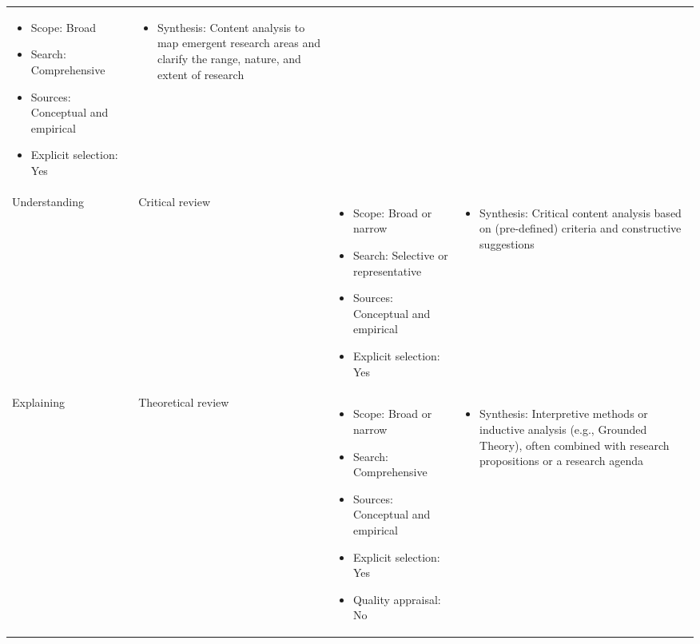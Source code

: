 \documentclass[11pt]{scrartcl}
\theoremstyle{aufgabenstyle}
\begin{document}
\begin{table}[H]
\begin{tabularx}{\textwidth}{l p{2.4cm} X X}
\begin{itemize}[leftmargin=*, noitemsep, topsep=0pt]
			\item Scope: Broad
			\item Search: Comprehensive
			\item Sources: Conceptual and empirical
			\item Explicit selection: Yes
		\end{itemize} & 
		\begin{itemize}[leftmargin=*, noitemsep, topsep=0pt]
			\item Synthesis: Content analysis to map emergent research areas and clarify the range, nature, and extent of research
		\end{itemize} \\
		Understanding & Critical review & 
		\begin{itemize}[leftmargin=*, noitemsep, topsep=0pt]
			\item Scope: Broad or narrow
			\item Search: Selective or representative
			\item Sources: Conceptual and empirical
			\item Explicit selection: Yes
		\end{itemize} & 
		\begin{itemize}[leftmargin=*, noitemsep, topsep=0pt]
			\item Synthesis: Critical content analysis based on (pre-defined) criteria and constructive suggestions
		\end{itemize} \\
		\midrule
		Explaining & Theoretical review & 
		\begin{itemize}[leftmargin=*, noitemsep, topsep=0pt]
			\item Scope: Broad or narrow
			\item Search: Comprehensive
			\item Sources: Conceptual and empirical
			\item Explicit selection: Yes
			\item Quality appraisal: No
		\end{itemize} & 
		\begin{itemize}[leftmargin=*, noitemsep, topsep=0pt]
			\item Synthesis: Interpretive methods or inductive analysis (e.g., Grounded Theory), often combined with research propositions or a research agenda
		\end{itemize} \\

\end{tabularx}
\end{table}
\end{document}
